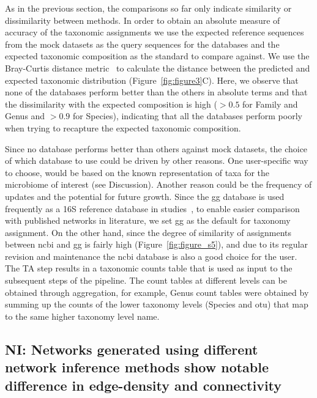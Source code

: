   As in the previous section, the comparisons so far only indicate similarity or dissimilarity between methods.
  In order to obtain an absolute measure of accuracy of the taxonomic assignments we use the expected reference sequences from the mock datasets as the query sequences for the databases and the expected taxonomic composition as the standard to compare against.
  We use the Bray-Curtis distance metric~\cite{virtanenSciPyFundamentalAlgorithms2020} to calculate the distance between the predicted and expected taxonomic distribution (Figure~\ref{fig:figure3}C).
  Here, we observe that none of the databases perform better than the others in absolute terms and that the dissimilarity with the expected composition is high ($>0.5$ for Family and Genus and $>0.9$ for Species), indicating that all the databases perform poorly when trying to recapture the expected taxonomic composition.

  Since no database performs better than others against mock datasets, the choice of which database to use could be driven by other reasons.
  One user-specific way to choose, would be based on the known representation of taxa for the microbiome of interest (see Discussion).
  Another reason could be the frequency of updates and the potential for future growth.
  Since the \ac{gg} database is used frequently as a 16S reference database in studies~\cite{Balvociute2017}, to enable easier comparison with published networks in literature, we set \ac{gg} as the default for taxonomy assignment.
  On the other hand, since the degree of similarity of assignments between \ac{ncbi} and \ac{gg} is fairly high (Figure~\ref{fig:figure_s5}), and due to its regular revision and maintenance the \ac{ncbi} database is also a good choice for the user.
  The TA step results in a taxonomic counts table that is used as input to the subsequent steps of the pipeline.
  The count tables at different levels can be obtained through aggregation, for example, Genus count tables were obtained by summing up the counts of the lower taxonomy levels (Species and \ac{otu}) that map to the same higher taxonomy level name.

  \FloatBarrier

  \subsection*{NI: Networks generated using different network inference methods show notable difference in edge-density and connectivity}

